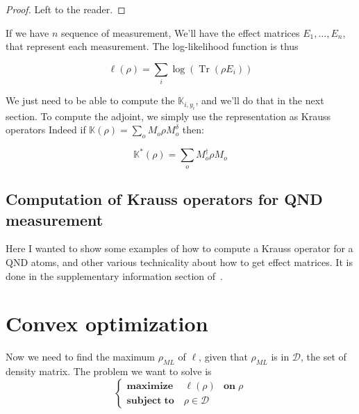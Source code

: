 \documentclass[10pt,a4paper]{report}
\theoremstyle{plain}
\theoremstyle{definition}
\theoremstyle{remark}
\newcommand{\TODO}{\textbf{TODO}}
\DeclareMathOperator{\Tr}{Tr}
\newcommand{\ml}{_{M\!L}}
\newcommand{\maxim}[3]{\begin{cases}
    \mathbf{maximize}\,\quad #1& \mathbf{on}\; #2\\
    \mathbf{subject\;to}\quad #3
  \end{cases}}
\begin{document}
\begin{proof}
  Left to the reader.
\end{proof}


If we have $n$ sequence of measurement, We'll have the effect
matrices $E_1, \ldots, E_n$, that represent each measurement. The log-likelihood
function is thus

\begin{equation}\label{eqn:ll}
  \ell(\rho) = \sum_i \log (\Tr(\rho E_i))
\end{equation}

We just need to be able to compute the $\mathbb K_{i,y_i}$, and we'll do that in
the next section. To compute the adjoint, we simply use the representation as
Krauss operators Indeed if $\mathbb K(\rho) = \sum\limits_o M_o\rho M_o^\delta$
then:

\[\mathbb K^*(\rho) = \sum_o M_o^\dagger \rho M_o\]

\section{Computation of Krauss operators for QND measurement}

Here I wanted to show some examples of how to compute a Krauss operator for a QND
atoms, and other various technicality about how to get effect matrices. It is
done in the supplementary information section of~\cite{VM19}.



\chapter{Convex optimization}

Now we need to find the maximum $\rho\ml$ of $\ell$, given that $\rho\ml$ is in
$\mathcal{D}$, the set of density matrix. The problem we want to solve is
\[\maxim {\ell(\rho)} \rho {\rho \in \mathcal{D}}\]
\end{document}
